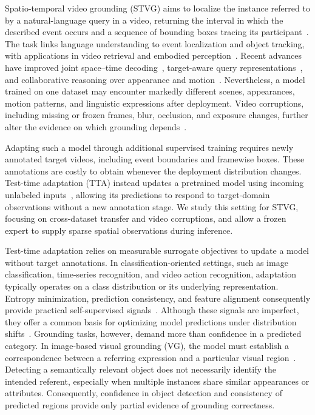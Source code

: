 \documentclass[10pt,twocolumn,letterpaper]{article}
\begin{document}
Spatio-temporal video grounding (STVG) aims to localize the instance
referred to by a natural-language query in a video, returning
the interval in which the described event occurs and a sequence of
bounding boxes tracing its participant~\cite{vidstg,tubedetr}.
The task links language understanding to event localization and object
tracking, with applications in video retrieval and embodied
perception~\cite{tastvg}. Recent advances have improved joint
space--time decoding~\cite{tubedetr}, target-aware query
representations~\cite{tastvg}, and collaborative reasoning over
appearance and motion~\cite{dualstream,e3m}. Nevertheless, a model
trained on one dataset may encounter markedly different scenes,
appearances, motion patterns, and linguistic expressions after
deployment. Video corruptions, including missing or frozen frames,
blur, occlusion, and exposure changes, further alter the evidence on
which grounding depends~\cite{tadcorruptions,vitta}.

Adapting such a model through additional supervised training requires
newly annotated target videos, including event boundaries and
framewise boxes. These annotations are costly to obtain whenever the
deployment distribution changes. Test-time adaptation (TTA) instead
updates a pretrained model using incoming unlabeled
inputs~\cite{tent,cotta}, allowing its predictions to respond to
target-domain observations without a new annotation stage. We study
this setting for STVG, focusing on cross-dataset transfer and video
corruptions, and allow a frozen expert
to supply sparse spatial observations during inference.


Test-time adaptation relies on measurable surrogate objectives to update
a model without target annotations. In classification-oriented settings,
such as image classification, time-series recognition, and video action
recognition, adaptation typically operates on a class distribution or
its underlying representation. Entropy minimization, prediction
consistency, and feature alignment consequently provide practical
self-supervised signals~\cite{tent,cotta,vitta}. Although these signals
are imperfect, they offer a common basis for optimizing model
predictions under distribution shifts~\cite{pitfalls}. Grounding tasks,
however, demand more than confidence in a predicted category.
In image-based visual grounding (VG), the model must establish a
correspondence between a referring expression and a particular visual
region~\cite{mdetr,groundingdino}. Detecting a semantically relevant
object does not necessarily identify the intended referent, especially
when multiple instances share similar appearances or attributes.
Consequently, confidence in object detection and consistency of
predicted regions provide only partial evidence of grounding
correctness.
\end{document}
